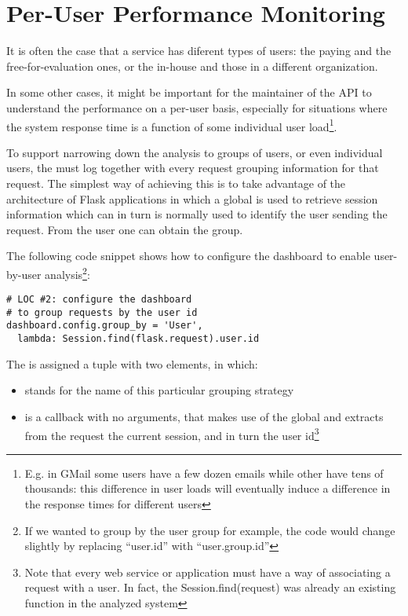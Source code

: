 
\section{Per-User Performance Monitoring}
\label{sec:user}

It is often the case that a service has diferent types of users: the paying and the free-for-evaluation ones, or the in-house and those in a different organization. 

In some other cases, it might be important for the maintainer of the API to understand the performance on a per-user basis, especially for situations where the system response time is a function of some individual user load\footnote{E.g. in GMail some users have a few dozen emails while other have tens of thousands: this difference in user loads will eventually induce a difference in the response times for different users}.

To support narrowing down the analysis to groups of users, or even individual users, the \tool must log together with every request grouping information for that request. The simplest way of achieving this is to take advantage of the architecture of Flask applications in which a global  is used to retrieve session information which can in turn is normally used to identify the user sending the request. From the user one can obtain the group. 

The following code snippet shows how to configure the dashboard to enable user-by-user analysis\footnote{	If we wanted to group by the user group for example, the code would change slightly by replacing ``user.id'' with ``user.group.id''}: 

\begin{lstlisting}[style=custompython]  
# LOC #2: configure the dashboard
# to group requests by the user id
dashboard.config.group_by = 'User',
  lambda: Session.find(flask.request).user.id

\end{lstlisting}

The  is assigned a tuple with two elements, in which:  

\begin{itemize}
	\item {} stands for the name of this particular grouping strategy
	\item {} is a callback with no arguments, 
	that makes use of the global  and extracts from 
	the request the current session, and in turn the user id\footnote{
		Note that every web service or application must have a way of 
		associating a request with a user. In fact, the Session.find(request) 
		was already an existing function in the analyzed system}
\end{itemize}

